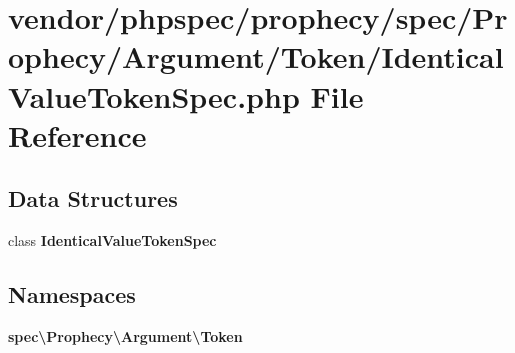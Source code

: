 \section{vendor/phpspec/prophecy/spec/\+Prophecy/\+Argument/\+Token/\+Identical\+Value\+Token\+Spec.php File Reference}
\label{_identical_value_token_spec_8php}
\subsection*{Data Structures}
\begin{DoxyCompactItemize}
\item 
class {\bf Identical\+Value\+Token\+Spec}
\end{DoxyCompactItemize}
\subsection*{Namespaces}
\begin{DoxyCompactItemize}
\item 
 {\bf spec\textbackslash{}\+Prophecy\textbackslash{}\+Argument\textbackslash{}\+Token}
\end{DoxyCompactItemize}
